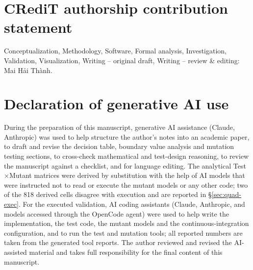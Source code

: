 \documentclass[11pt,a4paper]{article}
\newcommand{\VN}[1]{{\fontencoding{T5}\selectfont #1}}
\begin{document}
\section*{CRediT authorship contribution statement}

Conceptualization, Methodology, Software, Formal analysis, Investigation,
Validation, Visualization, Writing -- original draft,
Writing -- review \& editing: \VN{Mai H\h{a}i Th\`anh}.

\section*{Declaration of generative AI use}

During the preparation of this manuscript, generative AI assistance
(Claude, Anthropic) was used to help structure the author's notes into an
academic paper, to draft and revise the decision table, boundary value
analysis and mutation testing sections, to cross-check mathematical and
test-design reasoning, to review the manuscript against a checklist, and for
language editing. The analytical Test\(\times\)Mutant
matrices were derived by substitution with the help of AI models that were
instructed not to read or execute the mutant models or any other code; two
of the 818 derived cells disagree with execution and are reported in
\S\ref{sec:quad-exec}. For the
executed validation, AI coding assistants (Claude, Anthropic, and models
accessed through the OpenCode agent) were used to help write the
implementation, the test code, the mutant models and the
continuous-integration configuration, and to run the test and mutation
tools; all reported numbers are taken from the generated tool reports. The
author reviewed and revised the AI-assisted material and takes full
responsibility for the final content of this manuscript.
\end{document}
